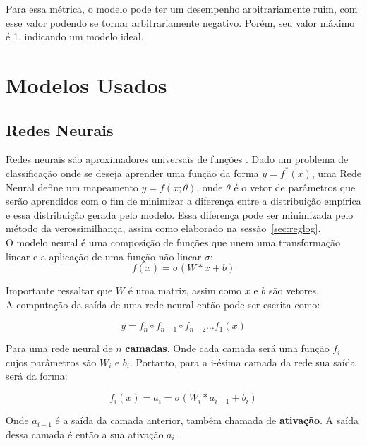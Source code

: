 Para essa métrica, o modelo pode ter um desempenho arbitrariamente ruim, com esse valor
podendo se tornar arbitrariamente negativo. Porém, seu valor máximo é 1,
indicando um modelo ideal.\\







\section{Modelos Usados} 

\subsection{Redes Neurais}

\label{sec:nn}
Redes neurais são aproximadores universais de funções \citep{nnuni}. Dado um problema
de classificação onde se deseja aprender uma função da forma $y = f^*(x)$, uma
Rede Neural define um mapeamento $y = f(x ; \theta)$, onde $\theta$ é o vetor de
parâmetros que serão aprendidos com o fim de minimizar a diferença entre a
distribuição empírica e essa distribuição gerada pelo modelo. Essa diferença pode
ser minimizada pelo método da verossimilhança, assim como elaborado na sessão~\ref{sec:reglog}.\\

O modelo neural é uma composição de funções que unem uma transformação linear e
a aplicação de uma função não-linear $\sigma$: \\

\[ f(x)=  \sigma(W*x + b) \]

Importante ressaltar que $W$ é uma matriz, assim como $x$ e $b$ são vetores. \\

A computação da saída de uma rede neural então pode ser escrita como:

\[   y = f_n \circ f_{n-1} \circ f_{n-2} \dots f_1(x)  \]

Para uma rede neural de $n$ \textbf{camadas}. Onde cada camada será uma função
$f_i$ cujos parâmetros são $W_i$ e $b_i$. Portanto, para a i-ésima camada da rede
sua saída será da forma: 

\[ f_i (x)=  a_i = \sigma(W_i*a_{i-1} + b_i) \]

Onde $a_{i-1}$ é a saída da camada anterior, também chamada de
\textbf{ativação}. A saída dessa camada é então a sua ativação $a_i$. \\ 

